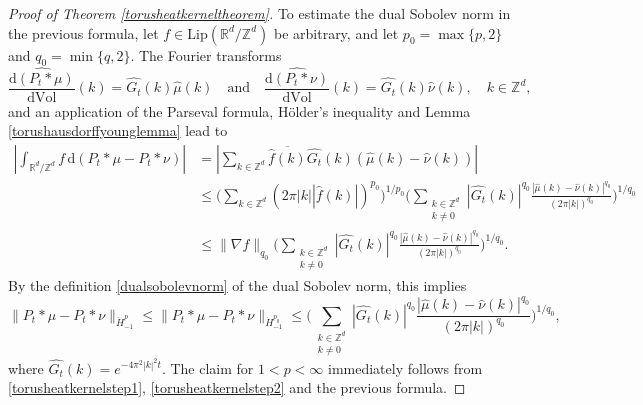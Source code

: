 \documentclass[11pt,a4paper]{article}
\theoremstyle{definition}
\begin{document}
\begin{proof}[Proof of Theorem \ref{torusheatkerneltheorem}]
To estimate the dual Sobolev norm in the previous formula, let $f \in \mathrm{Lip}(\mathbb{R}^d / \mathbb{Z}^d)$ be arbitrary, and let $p_0=\max \{ p, 2 \}$ and $q_0=\min \{ q, 2 \}$. The Fourier transforms
\[ \widehat{\frac{\mathrm{d}(P_t *\mu)}{\mathrm{d}\mathrm{Vol}}}(k) = \widehat{G_t}(k) \widehat{\mu}(k) \quad \textrm{and} \quad \widehat{\frac{\mathrm{d}(P_t *\nu)}{\mathrm{d}\mathrm{Vol}}}(k) = \widehat{G_t}(k) \widehat{\nu}(k), \quad k \in \mathbb{Z}^d, \]
and an application of the Parseval formula, H\"older's inequality and Lemma \ref{torushausdorffyounglemma} lead to
\[ \begin{split} \left| \int_{\mathbb{R}^d / \mathbb{Z}^d} f \, \mathrm{d} (P_t *\mu - P_t *\nu) \right| &= \left| \sum_{k \in \mathbb{Z}^d} \overline{\widehat{f}(k)} \widehat{G_t}(k) (\widehat{\mu}(k) - \widehat{\nu}(k)) \right| \\ &\le \Bigg( \sum_{k \in \mathbb{Z}^d} (2 \pi |k| |\widehat{f}(k)|)^{p_0} \Bigg)^{1/p_0} \Bigg( \sum_{\substack{k \in \mathbb{Z}^d \\ k \neq 0}} |\widehat{G_t}(k)|^{q_0} \frac{|\widehat{\mu}(k) - \widehat{\nu}(k)|^{q_0}}{(2 \pi |k|)^{q_0}} \Bigg)^{1/q_0} \\ &\le \| \nabla f \|_{q_0} \Bigg( \sum_{\substack{k \in \mathbb{Z}^d \\ k \neq 0}} |\widehat{G_t}(k)|^{q_0} \frac{|\widehat{\mu}(k) - \widehat{\nu}(k)|^{q_0}}{(2 \pi |k|)^{q_0}} \Bigg)^{1/q_0}. \end{split} \]
By the definition \eqref{dualsobolevnorm} of the dual Sobolev norm, this implies
\[ \| P_t *\mu - P_t *\nu \|_{\dot{H}_{-1}^p} \le \| P_t *\mu - P_t *\nu \|_{\dot{H}_{-1}^{p_0}} \le \Bigg( \sum_{\substack{k \in \mathbb{Z}^d \\ k \neq 0}} |\widehat{G_t}(k)|^{q_0} \frac{|\widehat{\mu}(k) - \widehat{\nu}(k)|^{q_0}}{(2 \pi |k|)^{q_0}} \Bigg)^{1/{q_0}}, \]
where $\widehat{G_t}(k) = e^{-4 \pi^2 |k|^2 t}$. The claim for $1<p<\infty$ immediately follows from \eqref{torusheatkernelstep1}, \eqref{torusheatkernelstep2} and the previous formula.


\end{proof}
\end{document}
